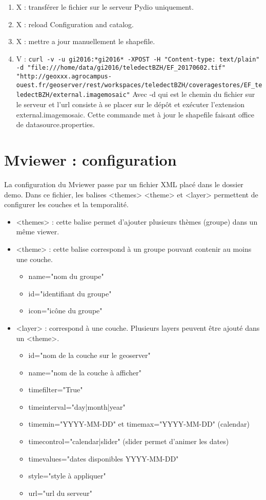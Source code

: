 \documentclass[10pt,a4paper]{article}
\begin{document}
\begin{enumerate}
\item X : transférer le fichier sur le serveur Pydio uniquement.
\item X : reload Configuration and catalog.
\item X : mettre a jour manuellement le shapefile.
\item V : \verb!curl -v -u gi2016:*gi2016* -XPOST -H "Content-type: text/plain" -d "file:///home/data/gi2016/teledectBZH/EF_20170602.tif" "http://geoxxx.agrocampus-ouest.fr/geoserver/rest/workspaces/teledectBZH/coveragestores/EF_teledectBZH/external.imagemosaic"! \smallbreak
Avec -d qui est le chemin du fichier sur le serveur et l'url consiste à se placer sur le dépôt et exécuter l'extension external.imagemosaic. Cette commande met à jour le shapefile faisant office de datasource.properties.
\end{enumerate}

\section{Mviewer : configuration}
La configuration du Mviewer passe par un fichier XML placé dans le dossier demo. Dans ce fichier, les balises <themes> <theme> et <layer> permettent de configurer les couches et la temporalité.

\begin{itemize}
\item <themes> : cette balise permet d'ajouter plusieurs thèmes (groupe) dans un même viewer.
\item <theme> : cette balise correspond à un groupe pouvant contenir au moins une couche.
\begin{itemize}
\item name="nom du groupe"
\item id="identifiant du groupe"
\item icon="icône du groupe"
\end{itemize}
\item <layer> : correspond à une couche. Plusieurs layers peuvent être ajouté dans un <theme>.
\begin{itemize}
\item id="nom de la couche sur le geoserver"
\item name="nom de la couche à afficher"
\item timefilter="True"
\item timeinterval="day|month|year"
\item timemin="YYYY-MM-DD" et timemax="YYYY-MM-DD" (calendar)
\item timecontrol="calendar|slider" (slider permet d'animer les dates)
\item timevalues="dates disponibles YYYY-MM-DD"
\item style="style à appliquer"
\item url="url du serveur"
\end{itemize}
\end{itemize}
\end{document}
